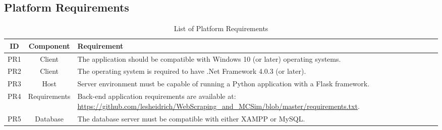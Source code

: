 \documentclass{thesis-ekf}
\theoremstyle{definition}
\theoremstyle{remark}
\begin{document}
\subsection{Platform Requirements}
\begin{table}[H]
	\centering
	\begin{tabular}{|c|c|>{\raggedright\arraybackslash}p{10cm}|}
		\hline
		\textbf{ID} & \textbf{Component} & \textbf{Requirement} \\
		\hline
		PR1 & Client & The application should be compatible with Windows 10 (or later) operating systems. \\
		\hline
		PR2 & Client & The operating system is required to have .Net Framework 4.0.3 (or later). \\
		\hline
		PR3 & Host & Server environment must be capable of running a Python application with a Flask framework. \\
		\hline
		PR4 & Requirements & Back-end application requirements are available at: \url{https://github.com/lesheidrich/WebScraping_and_MCSim/blob/master/requirements.txt}. \\
		\hline
		PR5 & Database & The database server must be compatible with either XAMPP or MySQL. \\
		\hline
	\end{tabular}
	\caption{List of Platform Requirements}
	\label{table-platform-req}
\end{table}
\end{document}
